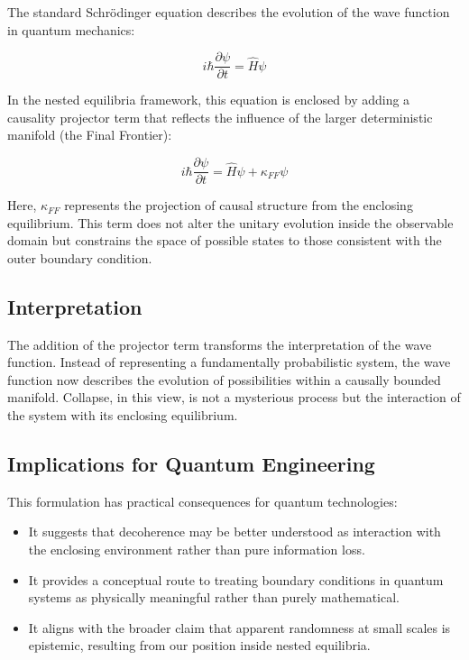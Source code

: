 \begin{sloppypar}

The standard Schrödinger equation describes the evolution of the wave function in quantum mechanics:

\begin{equation}
i \hbar \frac{\partial \psi}{\partial t} = \hat{H} \psi
\end{equation}

In the nested equilibria framework, this equation is enclosed by adding a causality projector term that reflects the influence of the larger deterministic manifold (the Final Frontier):

\begin{equation}
i \hbar \frac{\partial \psi}{\partial t} = \hat{H} \psi + \kappa_{FF} \psi
\end{equation}

Here, $\kappa_{FF}$ represents the projection of causal structure from the enclosing equilibrium. This term does not alter the unitary evolution inside the observable domain but constrains the space of possible states to those consistent with the outer boundary condition.

\subsection{Interpretation}

The addition of the projector term transforms the interpretation of the wave function. Instead of representing a fundamentally probabilistic system, the wave function now describes the evolution of possibilities within a causally bounded manifold. Collapse, in this view, is not a mysterious process but the interaction of the system with its enclosing equilibrium.

\subsection{Implications for Quantum Engineering}

This formulation has practical consequences for quantum technologies:

\begin{itemize}
    \item It suggests that decoherence may be better understood as interaction with the enclosing environment rather than pure information loss.
    \item It provides a conceptual route to treating boundary conditions in quantum systems as physically meaningful rather than purely mathematical.
    \item It aligns with the broader claim that apparent randomness at small scales is epistemic, resulting from our position inside nested equilibria.
\end{itemize}


\end{sloppypar}
